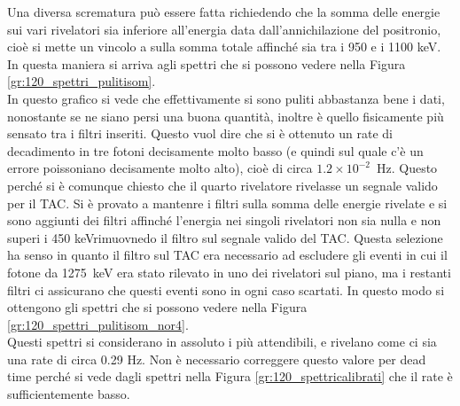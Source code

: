 Una diversa scrematura può essere fatta richiedendo che la somma delle energie sui vari rivelatori sia inferiore all'energia data dall'annichilazione del positronio, cioè si
mette un vincolo a sulla somma totale affinché sia tra i 950 e i 1100 keV. In questa maniera si arriva agli spettri che si possono vedere nella 
Figura \ref{gr:120_spettri_pulitisom}.\\


In questo grafico si vede che effettivamente si sono puliti abbastanza bene i dati, nonostante se ne siano persi una buona quantità, inoltre è quello fisicamente più
sensato tra i filtri inseriti. Questo vuol dire che si è ottenuto un rate di decadimento in tre fotoni decisamente molto basso (e quindi sul quale c'è un errore poissoniano
decisamente molto alto), cioè di circa $1.2 \times 10^{-2}$~Hz. Questo perché si è comunque chiesto che il quarto rivelatore rivelasse un
segnale valido per il TAC. Si è provato a mantenre i filtri
sulla somma delle energie rivelate e si sono aggiunti dei filtri affinché l'energia nei singoli rivelatori non sia nulla e non superi i 450 keVrimuovnedo il filtro sul
segnale valido del TAC. Questa selezione ha senso in quanto il filtro sul TAC era necessario ad escludere gli eventi in cui il fotone da 1275~keV era stato rilevato in uno dei rivelatori sul piano, ma i restanti filtri ci assicurano che questi eventi sono in ogni caso scartati. In questo modo si ottengono gli spettri che si possono vedere nella Figura \ref{gr:120_spettri_pulitisom_nor4}.\\


Questi spettri si considerano in assoluto i più attendibili, e rivelano come ci sia una rate di circa 0.29 Hz. Non è necessario correggere questo valore per dead time perché
si vede dagli spettri nella Figura \ref{gr:120_spettricalibrati} che il rate è sufficientemente basso.
\FloatBarrier

